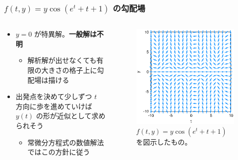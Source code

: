 \documentclass[dvipdfmx,aspectratio=169,20pt]{beamer}
\newcommand{\myfontsetting}[3]{{\fontsize{#1}{#2}\selectfont #3}}
\begin{document}
\begin{frame}
\frametitle{\myfontsetting{22pt}{22pt}{[図解] $f(t,y) = y\cos(e^t + t + 1)$ の勾配場}}
\begin{columns}[t]
\begin{column}{0.48\textwidth} 
\vspace{-8mm}
\begin{itemize}
    \item 
    \myfontsetting{12pt}{12pt}{$y=0$ が特異解。{\bf 一般解は不明}}
    \begin{itemize}
        \item \myfontsetting{10pt}{10pt}{解析解が出せなくても有限の大きさの格子上に勾配場は描ける}
    \end{itemize}
    \vspace{-1mm}
    \item \myfontsetting{12pt}{12pt}{
        出発点を決めて少しずつ $t$ 方向に歩を進めていけば $y(t)$ の形が近似として求められそう
        }
    \begin{itemize}
        \item \myfontsetting{10pt}{10pt}{常微分方程式の数値解法ではこの方針に従う}
    \end{itemize}
\end{itemize}
\end{column}

\begin{column}{0.52\textwidth} 
\begin{figure}[h]
	\begin{center}
\vspace{-10mm}
    	\includegraphics[width=1.0\textwidth]{fig12-7_differential_equation_difficult.eps}
	\end{center}
	\vspace{-5mm}
	\caption{\myfontsetting{10pt}{10pt}{$f(t,y) = y\cos(e^t + t + 1)$ を図示したもの。}}
\end{figure}
\end{column}
\end{columns}
\end{frame}
\end{document}
